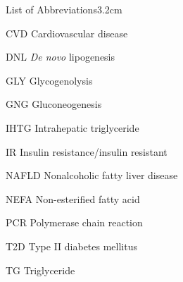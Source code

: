 \begin{mclistof}{List of Abbreviations}{3.2cm}

\item[CVD] Cardiovascular disease

\item[DNL] \textit{De novo} lipogenesis

\item[GLY] Glycogenolysis

\item[GNG] Gluconeogenesis

\item[IHTG] Intrahepatic triglyceride

\item[IR] Insulin resistance/insulin resistant

\item[NAFLD] Nonalcoholic fatty liver disease

\item[NEFA] Non-esterified fatty acid

\item[PCR] Polymerase chain reaction

\item[T2D] Type II diabetes mellitus 

\item[TG] Triglyceride

\end{mclistof} 
